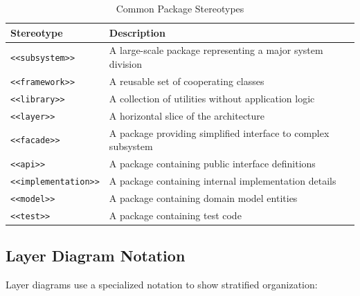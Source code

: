 \documentclass[11pt,letterpaper]{article}
\begin{document}
\begin{table}[H]
\centering
\caption{Common Package Stereotypes}
\small
\begin{tabular}{@{}L{3.5cm}L{10cm}@{}}
\toprule
\textbf{Stereotype} & \textbf{Description} \\
\midrule
\texttt{<<subsystem>>} & A large-scale package representing a major system division \\
\texttt{<<framework>>} & A reusable set of cooperating classes \\
\texttt{<<library>>} & A collection of utilities without application logic \\
\texttt{<<layer>>} & A horizontal slice of the architecture \\
\texttt{<<facade>>} & A package providing simplified interface to complex subsystem \\
\texttt{<<api>>} & A package containing public interface definitions \\
\texttt{<<implementation>>} & A package containing internal implementation details \\
\texttt{<<model>>} & A package containing domain model entities \\
\texttt{<<test>>} & A package containing test code \\
\bottomrule
\end{tabular}
\end{table}

\subsection{Layer Diagram Notation}

Layer diagrams use a specialized notation to show stratified organization:
\end{document}
